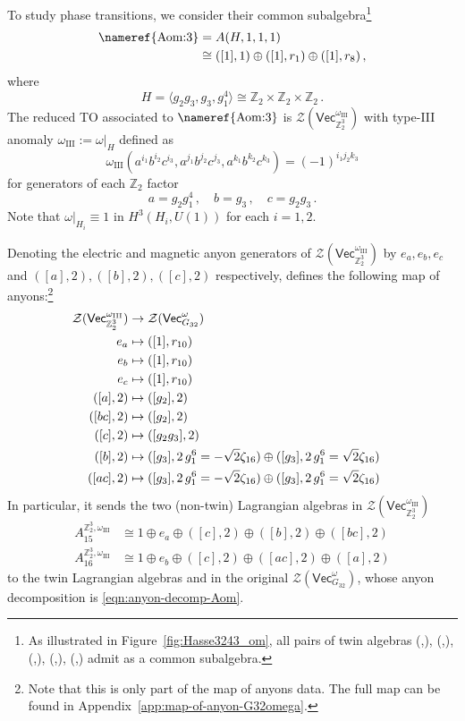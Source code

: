 \documentclass[aps,twocolumn,prx,floatfix,preprintnumbers, nofootinbib,10pt]{revtex4-2}
\numberwithin{equation}{section}
\theoremstyle{definition}
\newcommand{\be}{\begin{equation}}
\newcommand{\ee}{\end{equation}}
\newcommand{\nn}{\nonumber}
\newcommand{\Z}{{\mathbb Z}}
\newcommand{\cZ}{\mathcal{Z}}
\renewcommand{\Vec}{\mathsf{Vec}}
\newcommand{\III}{\text{III}}
\begin{document}
To study phase transitions, we consider their common subalgebra\footnote{As illustrated in Figure~\ref{fig:Hasse3243_om}, all pairs of twin algebras (,), (,), (,), (,), (,) admit  as a common subalgebra.} 
\begin{align}
\text{\nameref{Aom:3}}&=A(H, 1, 1, 1) \nn\\
&\cong ([1],1) \oplus ([1],r_1) \oplus ([1],r_8)\,,
\end{align}
where
\be
    H=\langle g_2g_3,g_3,g_1^4 \rangle\cong\Z_2\times\Z_2\times\Z_2\,.
\ee
The reduced TO associated to $\text{\nameref{Aom:3}}$ is $\cZ(\Vec_{\Z_2^3}^{\omega_{\text{III}}})$ with type-III anomaly $\omega_\III:=\omega|_H$ defined as
\be
    \omega_\III(a^{i_1}b^{i_2}c^{i_3},a^{j_1}b^{j_2}c^{j_3},a^{k_1}b^{k_2}c^{k_3})=(-1)^{i_1j_2k_3}
\ee
for generators of each $\Z_2$ factor
\be
    a=g_2g_1^4\,,\quad b=g_3\,, \quad c=g_2g_3\,.
\ee
Note that $\omega|_{H_i}\equiv1$ in $H^3(H_i, U(1))$ for each $i=1,2$.

Denoting the electric and magnetic anyon generators of $\cZ(\Vec_{\Z_2^3}^{\omega_{\text{III}}})$ by $e_a,e_b,e_c$ and $([a],2),([b],2),([c],2)$ respectively, \noindent{} defines the following map of anyons:\footnote{Note that this is only part of the map of anyons data. The full map can be found in Appendix~\ref{app:map-of-anyon-G32omega}.}
\begin{align}
\label{eqn:map-of-anyon-A3omega}
    \cZ(\Vec_{\Z_2^3}^{\omega_{\text{III}}}) & \rightarrow \cZ(\Vec_{G_{32}}^\omega) \cr
    e_{a} &\mapsto ([1],r_{10}) \cr 
    e_{b} &\mapsto ([1],r_{10}) \cr 
    e_{c} &\mapsto ([1],r_{10}) \cr 
    ([a],2) &\mapsto ([g_2],2) \cr 
    ([bc],2) &\mapsto ([g_2],2) \cr 
    ([c],2) &\mapsto ([g_2g_3],2) \cr 
    ([b],2) &\mapsto ([g_3],2\, g_1^6=-\sqrt{2}\zeta_{16}) \oplus ([g_3],2\, g_1^6=\sqrt{2}\zeta_{16}) \cr 
    ([ac],2) &\mapsto ([g_3],2\, g_1^6=-\sqrt{2}\zeta_{16}) \oplus ([g_3],2\, g_1^6=\sqrt{2}\zeta_{16}) \cr 
\end{align}
In particular, it sends the two (non-twin) Lagrangian algebras in $\cZ(\Vec_{\Z_2^3}^{\omega_{\text{III}}})$
\begin{align} \label{eq:tilde_A15}
    A_{15}^{\Z_2^3,\omega_{\text{III}}} & \cong 1\oplus e_a\oplus([c],2)\oplus([b],2)\oplus([bc],2)\\
    A_{16}^{\Z_2^3,\omega_{\text{III}}} & \cong 1 \oplus e_b \oplus ([c],2) \oplus ([ac],2) \oplus ([a],2)\label{eq:tilde_A16}
\end{align}
to the twin Lagrangian algebras  and  in the original $\cZ(\Vec_{G_{32}}^\omega)$, whose anyon decomposition is \eqref{eqn:anyon-decomp-Aom}.
\end{document}
